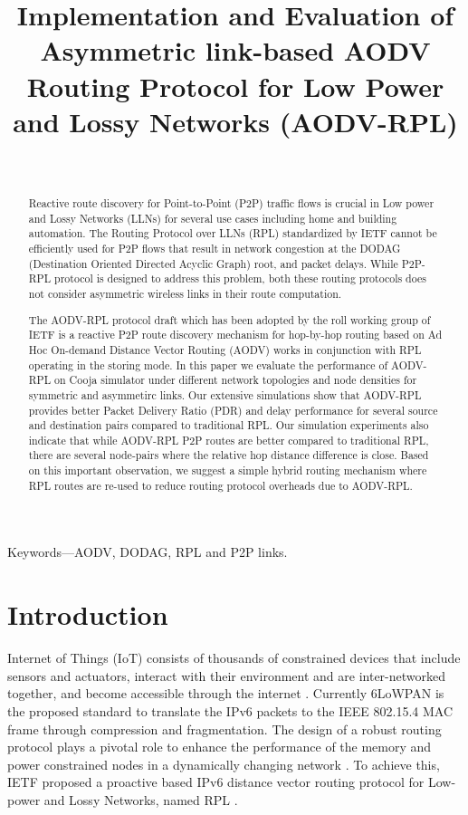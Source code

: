 \documentclass[conference, letterpaper]{IEEEtran}
\title{ Implementation and Evaluation of Asymmetric link-based AODV
Routing Protocol for Low Power and Lossy Networks (AODV-RPL)}
\author{ \IEEEauthorblockN{Lavanya HM, Anand S V R, Malati Hegde} \
\IEEEauthorblockA{ECE Department, Indian Institute of Science \\ \{lavanyahm,
anandsvr, malati\}@iisc.ac.in} }
\begin{document}
 
\maketitle 
\begin{abstract}

Reactive route discovery for Point-to-Point (P2P) traffic flows is crucial in
Low power and Lossy Networks (LLNs) for several use cases including home and
building automation. The Routing Protocol over LLNs (RPL) standardized by IETF
cannot be efficiently used for P2P flows that result in network congestion at
the DODAG (Destination Oriented Directed Acyclic Graph) root, and packet delays.
While P2P-RPL protocol is designed to address this problem, both these routing
protocols does not consider asymmetric wireless links in their route
computation.

The AODV-RPL protocol draft which has been adopted by the roll working group of
IETF is a reactive P2P route discovery mechanism for hop-by-hop routing based on
Ad Hoc On-demand Distance Vector Routing (AODV) works in conjunction with RPL
operating in the storing mode. In this paper we evaluate the performance of
AODV-RPL on Cooja simulator under different network topologies and node
densities for symmetric and asymmetirc links. Our extensive simulations show
that AODV-RPL provides better Packet Delivery Ratio (PDR) and delay performance
for several source and destination pairs compared to traditional RPL. Our
simulation experiments also indicate that while AODV-RPL P2P routes are better
compared to traditional RPL, there are several node-pairs where the relative hop
distance difference is close. Based on this important observation, we suggest a
simple hybrid routing mechanism where RPL routes are re-used to reduce routing
protocol overheads due to AODV-RPL.



\end{abstract}

Keywords—AODV, DODAG, RPL and P2P links.  \section{Introduction}

Internet of Things (IoT) consists of thousands of constrained devices that
include sensors and actuators, interact with their environment and are
inter-networked together, and become accessible through the internet
\cite{iot,industry,iotservey}.  Currently 6LoWPAN \cite{iotstack} is the
proposed standard to translate the IPv6 packets to the IEEE 802.15.4 MAC frame
through compression and fragmentation. The design of a robust routing protocol
plays a pivotal role to enhance the performance of the memory and power
constrained nodes in a dynamically changing network \cite{lowpan}. To achieve
this, IETF proposed a proactive based IPv6 distance vector routing protocol for
Low-power and Lossy Networks, named RPL \cite{RFC6550}. 
\end{document}
